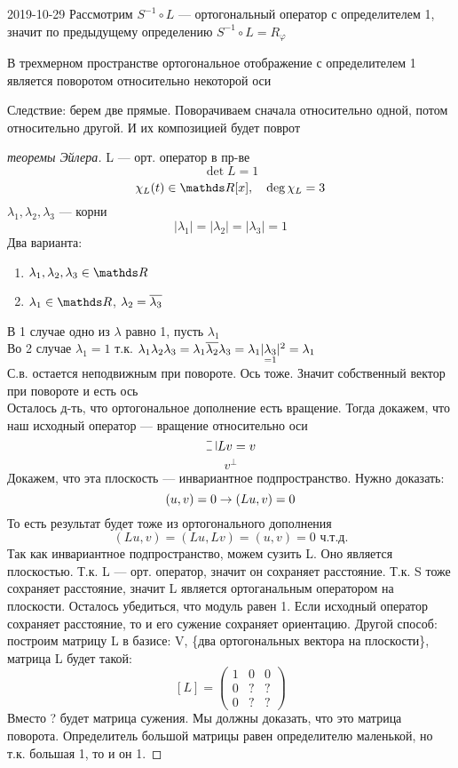 \documentclass[main]{subfiles}
\begin{document}
\begin{lect}{2019-10-29}
    Рассмотрим $S^{-1} \circ L$ --- ортогональный оператор с определителем 1, значит по предыдущему определению $S^{-1} \circ L = R_{\varphi}$

    \begin{utv}
      В трехмерном пространстве ортогональное отображение с определителем 1 является поворотом относительно некоторой оси
    \end{utv}

    Следствие: берем две прямые. Поворачиваем сначала относительно одной, потом относительно другой. И их композицией будет поврот

    \begin{proof}[теоремы Эйлера]
      L --- орт. оператор в пр-ве
      \[\det L = 1\]
      \[\chi_L(t) \in \R[x],\q \deg \chi_L = 3\]
      $\lambda_1, \lambda_2, \lambda_3$ --- корни
      \[|\lambda_1| = |\lambda_2| = |\lambda_3| = 1\]
      Два варианта:
      \begin{enumerate}
        \item $\lambda_1, \lambda_2, \lambda_3 \in \R$
        \item $\lambda_1 \in \R$, $\lambda_2 = \overline{\lambda_3}$
      \end{enumerate}
      В 1 случае одно из $\lambda$ равно 1, пусть $\lambda_1$\\
      Во 2 случае $\lambda_1 = 1$ т.к. $\lambda_1 \lambda_2 \lambda_3 = \lambda_1 \overline{\lambda_2} \lambda_3 = \lambda_1 |\underset{=1}{\lambda_3}|^2 = \lambda_1$\\
      С.в. остается неподвижным при повороте. Ось тоже. Значит собственный вектор  при повороте и есть ось\\
      Осталось д-ть, что ортогональное дополнение есть вращение. Тогда докажем, что наш исходный оператор --- вращение относительно оси
      \[\letus Lv = v\]
      \[v^{\bot}\]
      Докажем, что эта плоскость --- инвариантное подпространство. Нужно доказать:
      \[(u,v) = 0 \rightarrow (Lu, v) = 0\]
      То есть результат будет тоже из ортогонального дополнения
      \[(Lu,v) = (Lu, Lv) = (u,v) = 0 \text{ ч.т.д.}\]
      Так как инвариантное подпространство, можем сузить L. Оно является плоскостью. Т.к. L --- орт. оператор, значит он сохраняет расстояние. Т.к. S тоже сохраняет расстояние, значит L является ортоганальным оператором на плоскости. Осталось убедиться, что модуль равен 1. Если исходный оператор сохраняет расстояние, то и его сужение сохраняет ориентацию. Другой способ: построим матрицу L в базисе: V, \{два ортогональных вектора на плоскости\}, матрица L будет такой:\\
      \[[L] = \begin{pmatrix}
        1 & 0 & 0\\
        0 & ? & ?\\
        0 & ? & ?
      \end{pmatrix}\]
      Вместо ? будет матрица сужения. Мы должны доказать, что это матрица поворота. Определитель большой матрицы равен определителю маленькой, но т.к. большая 1, то и он 1.


\end{proof}
\end{lect}
\end{document}
